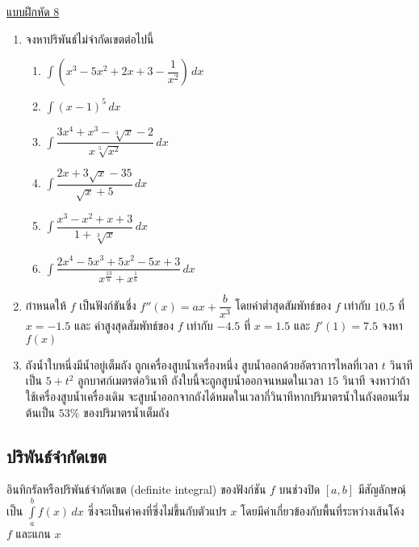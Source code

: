 \documentclass[hidelinks,12pt,a4paper]{article}
\newcommand{\s}{\space}
\newcommand{\nr}[2]{\sqrt[#1]{#2}}
\begin{document}
\underline{\large แบบฝึกหัด 8}
\begin{enumerate}
    \item จงหาปริพันธ์ไม่จำกัดเขตต่อไปนี้
    \begin{multicols}{2}
    \begin{enumerate}
        \renewcommand{\labelenumii}{\arabic{enumii})}
        \item $\displaystyle \int \left(x^3-5x^2+2x+3-\dfrac{1}{x^2}\right)\,dx$
        \vspace{65mm}
        \item $\displaystyle\int (x-1)^5\,dx$
        \vspace{65mm}
        \item $\displaystyle\int \dfrac{3x^4+x^3-\nr{3}{x}-2}{x\nr{5}{x^2}}\,dx$
        \item $\displaystyle\int \dfrac{2x+3\sqrt{x}-35}{\sqrt{x}+5}\,dx$
        \vspace{65mm}
        \item $\displaystyle\int \dfrac{x^3-x^2+x+3}{1+\nr{3}{x}}\,dx$
        \vspace{65mm}
        \item $\displaystyle\int \dfrac{2x^4-5x^3+5x^2-5x+3}{x^{\frac{13}{6}}+x^{\frac{1}{6}}}\,dx$
    \end{enumerate}
    \end{multicols}
    \newpage
    \item กำหนดให้ $f$ เป็นฟังก์ชันซึ่ง \s $f''(x)=ax+\dfrac{b}{x^3}$ \s โดยค่าต่ำสุดสัมพัทธ์ของ $f$ เท่ากับ $10.5$ ที่ $x=-1.5$ \s และ ค่าสูงสุดสัมพัทธ์ของ $f$ เท่ากับ $-4.5$ ที่ $x=1.5$ \s และ $f'(1)=7.5$ \s\s จงหา $f(x)$
    \vspace{90mm}
    \item ถังน้ำใบหนึ่งมีน้ำอยู่เต็มถัง ถูกเครื่องสูบน้ำเครื่องหนึ่ง สูบน้ำออกด้วยอัตราการไหลที่เวลา $t$ วินาทีเป็น $5+t^2$ ลูกบาศก์เมตรต่อวินาที ถังใบนี้จะถูกสูบน้ำออกจนหมดในเวลา $15$ วินาที จงหาว่าถ้าใช้เครื่องสูบน้ำเครื่องเดิม จะสูบน้ำออกจากถังได้หมดในเวลากี่วินาทีหากปริมาตรน้ำในถังตอนเริ่มต้นเป็น $53\%$ ของปริมาตรน้ำเต็มถัง
\end{enumerate}
\newpage
\subsection{ปริพันธ์จำกัดเขต}
อินทิกรัลหรือปริพันธ์จำกัดเขต (definite integral) ของฟังก์ชัน $f$ บนช่วงปิด $[a,b]$ มีสัญลักษณฺ์เป็น 
$\displaystyle\int\limits_a^b f(x)\,dx$
ซึ่งจะเป็นค่าคงที่ซึ่งไม่ขึ้นกับตัวแปร $x$ \s โดยมีค่าเกี่ยวข้องกับพื้นที่ระหว่างเส้นโค้ง $f$ และแกน $x$
\end{document}
